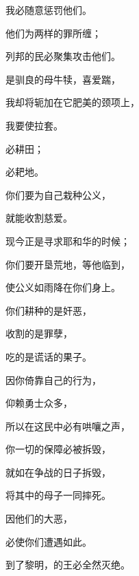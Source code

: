 {\par }{\Q {}我必随意惩罚他们。
\par }{\Q 他们为两样的罪所缠；
\par }{\Q 列邦的民必聚集攻击他们。
\par }{\BB \par }{\Q {}是驯良的母牛犊，喜爱踹{}，
\par }{\Q 我却将轭加在它肥美的颈项上，
\par }{\Q 我要使{}拉套。
\par }{必耕田；
\par }{必耙地。
\par }{\Q {}你们要为自己栽种公义，
\par }{\Q 就能收割慈爱。
\par }{\Q 现今正是寻求耶和华的时候；
\par }{\Q 你们要开垦荒地，等他临到，
\par }{\Q 使公义如雨降在你们身上。
\par }{\BB \par }{\Q {}你们耕种的是奸恶，
\par }{\Q 收割的是罪孽，
\par }{\Q 吃的是谎话的果子。
\par }{\Q 因你倚靠自己的行为，
\par }{\Q 仰赖勇士众多，
\par }{\Q {}所以在这民中必有哄嚷之声，
\par }{\Q 你一切的保障必被拆毁，
\par }{\Q 就如{}在争战的日子拆毁{}，
\par }{\Q 将其中的母子一同摔死。
\par }{\Q {}因他们的大恶，
\par }{必使你们遭遇如此。
\par }{\Q 到了黎明，{}的王必全然灭绝。

}
